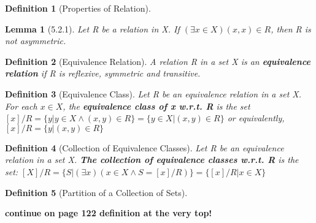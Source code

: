 \documentclass[12pt, letterpaper]{article}
\theoremstyle{plain}
\newtheorem*{lemma*}{Lemma}
\newtheorem*{definition*}{Definition}
\begin{document}
\begin{mdframed}[leftmargin=0.01cm, rightmargin=0.01cm]
\begin{definition*}[Properties of Relation]
\begin{itemize}
            \end{itemize}
        \end{definition*}
        \begin{lemma*}[5.2.1]
            Let R be a relation in X. If $(\exists x \in X)(x,x)\in R$, then R is not asymmetric.
        \end{lemma*}
        \begin{definition*}[Equivalence Relation]
            A relation R in a set X is an \textbf{equivalence relation} if R is reflexive, symmetric and transitive.
        \end{definition*}
        \begin{definition*}[Equivalence Class]
            Let R be an equivalence relation in a set X. For each $x \in X$, the \textbf{equivalence class of x w.r.t. R} is the set \\$\left[x\right]/R = \{y | y \in X \wedge (x,y) \in R\} = \{y \in X | (x,y) \in R\}$ or equivalently,
            \\$\left[x\right]/R = \{y | (x,y) \in R\}$
        \end{definition*}
        \begin{definition*}[Collection of Equivalence Classes]
            Let R be an equivalence relation in a set X. \textbf{The collection of equivalence classes w.r.t. R} is the set: $\left[X\right]/R = \{S | (\exists x)(x \in X \wedge S = \left[x\right]/R)\} = \{\left[x\right]/R | x \in X\}$
        \end{definition*}
    \end{mdframed}
    \newpage
    \begin{mdframed}[leftmargin=0.01cm, rightmargin=0.01cm]
        \begin{definition*}[Partition of a Collection of Sets]
            
        \end{definition*}
        \textbf{continue on page 122 definition at the very top!}
    \end{mdframed}
\end{document}
